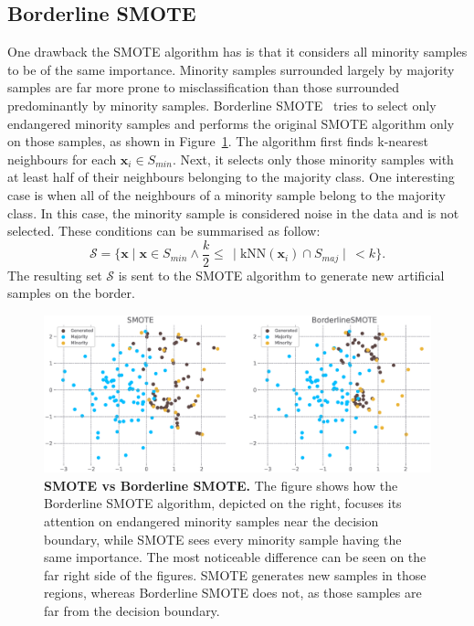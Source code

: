 \subsection{Borderline SMOTE}
\label{subsection:bordeline-smote}

One drawback the SMOTE algorithm has is that it considers all minority samples to be of the same
importance. Minority samples surrounded largely by majority samples are far more prone to
misclassification than those surrounded predominantly by minority samples. Borderline
SMOTE~\cite{borderline-smote} tries to select only endangered minority samples and performs the
original SMOTE algorithm only on those samples, as shown in
Figure~\ref{figure:smote-vs-borderline}. The algorithm first finds k-nearest neighbours for each
$\mathbf{x}_i \in S_{min}$. Next, it selects only those minority samples with at least half of
their neighbours belonging to the majority class. One interesting case is when all of the
neighbours of a minority sample belong to the majority class. In this case, the minority sample is
considered noise in the data and is not selected. These conditions can be summarised as follow:
\begin{equation}
    \mathcal{S} = \{\mathbf{x} \mid \mathbf{x} \in S_{min} \land \frac{k}{2} \leq \, \mid
        \mathrm{kNN}(\mathbf{x}_i) \cap S_{maj} \mid \, < k\}.
\end{equation}
The resulting set $\mathcal{S}$ is sent to the SMOTE algorithm to generate new artificial samples
on the border.

\begin{figure}
    \centering
    \includegraphics[width=\linewidth]{figures/smote_vs_borderlinesmote.eps}
    \caption{
        \textbf{SMOTE vs Borderline SMOTE.} The figure shows how the Borderline SMOTE algorithm,
        depicted on the right, focuses its attention on endangered minority samples near the
        decision boundary, while SMOTE sees every minority sample having the same importance. The
        most noticeable difference can be seen on the far right side of the figures. SMOTE
        generates new samples in those regions, whereas Borderline SMOTE does not, as those samples
        are far from the decision boundary.
    }
    \label{figure:smote-vs-borderline}
\end{figure}


